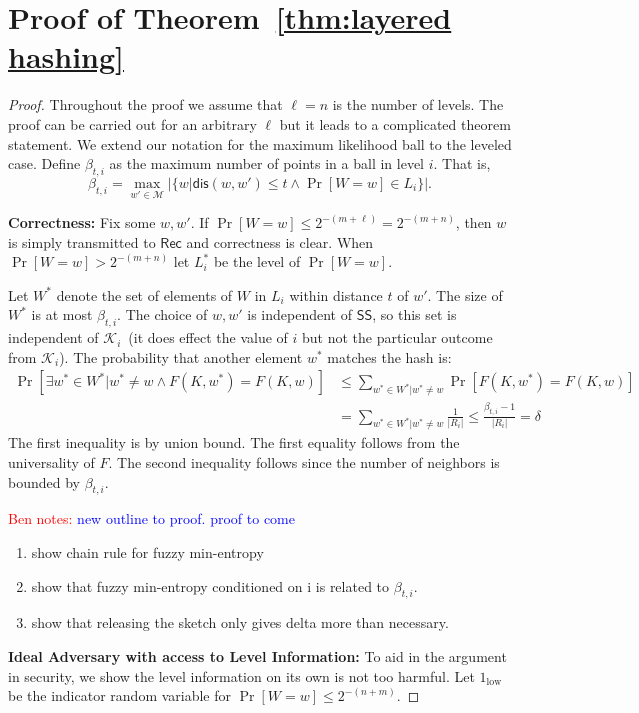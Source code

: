 \documentclass[11pt]{article}
\newcommand{\thref}[1]{\mbox{Theorem~\ref{#1}}}
\newcommand{\class}[1]{{\ensuremath{\mathsf{#1}}}}
\newcommand{\sketch}{\ensuremath{\class{SS}}\xspace}
\newcommand{\rec}{\ensuremath{\class{Rec}}\xspace}
\newcommand{\dis}{\ensuremath{\mathsf{dis}}}
\newcommand{\authnote}[2]{{\textcolor{red}{\textsf{#1 notes: }\textcolor{blue}{ #2}}\marginpar{\textcolor{red}{\textbf{!!!!!}}}}}
\newcommand{\authnote}[2]{}
\newcommand{\bnote}[1]{{\authnote{Ben}{#1}}}
\begin{document}
\section{Proof of \thref{thm:layered hashing}}
\label{sec:proof of layered hashing}
\begin{proof}
Throughout the proof we assume that $\ell = n$ is the number of levels.  The proof can be carried out for an arbitrary $\ell$ but it leads to a complicated theorem statement.
We extend our notation for the maximum likelihood ball to the leveled case.  Define $\beta_{t,i}$ as the maximum number of points in a ball in level $i$.  That is,
\[
\beta_{t,i} = \max_{w' \in \mathcal{M}} \left|\{w | \dis(w, w')\le t \wedge \Pr[W=w]\in L_i\}\right|.
\]


\noindent
\textbf{Correctness:}  Fix some $w, w'$.  If $\Pr[W=w]\le 2^{-(m+\ell)} = 2^{-(m+n)}$, then $w$ is simply transmitted to $\rec$ and correctness is clear.  When $\Pr[W=w]> 2^{-(m+n)}$ let $L_i^*$ be the level of $\Pr[W=w]$.

Let $W^*$ denote the set of elements of $W$ in $L_i$ within distance $t$ of $w'$.  The size of $W^*$ is at most $\beta_{t,i}$. The choice of $w, w'$ is independent of $\sketch$, so this set is independent of $\mathcal{K}_i$~(it does effect the value of $i$ but not the particular outcome from $\mathcal{K}_i$).  The probability that another element $w^*$ matches the hash is:
\begin{align*}
\Pr[\exists w^* \in W^* |w^* \neq w \wedge F(K, w^*) = F(K, w)] &\le \sum_{w^*\in W^* | w^*\neq w} \Pr[F(K, w^*) = F(K, w)] \\
 &= \sum_{w^*\in W^* | w^*\neq w} \frac{1}{|R_i|} \le \frac{\beta_{t,i}-1}{|R_i|} = \delta
\end{align*}
The first inequality is by union bound. The first equality follows from the universality of $F$.  The second inequality follows since the number of neighbors is bounded by $\beta_{t,i}$.  

\bnote{new outline to proof. proof to come}
\begin{enumerate}
\item show chain rule for fuzzy min-entropy
\item show that fuzzy min-entropy conditioned on i is related to $\beta_{t, i}$.
\item show that releasing the sketch only gives delta more than necessary.
\end{enumerate}
\noindent
\textbf{Ideal Adversary with access to Level Information:} To aid in the argument in security, we show the level information on its own is not too harmful.  Let $1_{\text{low}}$ be the indicator random variable for $\Pr[W=w]\le 2^{-(n+m)}$.  


\end{proof}
\end{document}
